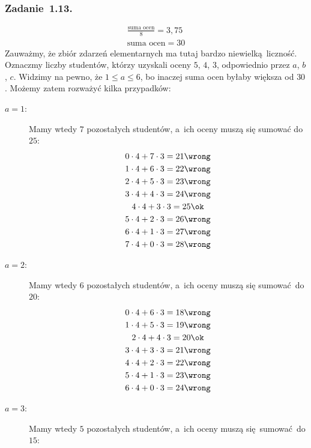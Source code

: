 \subsubsection*{Zadanie~1.13.}
\begin{gather*}
    \frac{\text{suma ocen}}{8} = 3{,}75\\
    \text{suma ocen} = 30
\end{gather*}
Zauważmy, że zbiór zdarzeń elementarnych ma tutaj bardzo niewielką liczność. Oznaczmy liczby studentów, którzy uzyskali oceny \(5\), \(4\), \(3\), odpowiednio przez \(a\), \(b\), \(c\). Widzimy na pewno, że \(1 \leq a \leq 6\), bo inaczej suma ocen byłaby większa od \(30\). Możemy zatem rozważyć kilka przypadków:
\begin{description}
    \item[\(a = 1\):] Mamy wtedy \(7\) pozostałych studentów, a~ich oceny muszą się sumować do \(25\):
        \begin{gather*}
            0 \cdot 4 + 7 \cdot 3 = 21 \wrong\\
            1 \cdot 4 + 6 \cdot 3 = 22 \wrong\\
            2 \cdot 4 + 5 \cdot 3 = 23 \wrong\\
            3 \cdot 4 + 4 \cdot 3 = 24 \wrong\\
            4 \cdot 4 + 3 \cdot 3 = 25 \ok\\
            5 \cdot 4 + 2 \cdot 3 = 26 \wrong\\
            6 \cdot 4 + 1 \cdot 3 = 27 \wrong\\
            7 \cdot 4 + 0 \cdot 3 = 28 \wrong
        \end{gather*}
    \item[\(a = 2\):] Mamy wtedy \(6\) pozostałych studentów, a~ich oceny muszą się sumować do \(20\):
        \begin{gather*}
            0 \cdot 4 + 6 \cdot 3 = 18 \wrong\\
            1 \cdot 4 + 5 \cdot 3 = 19 \wrong\\
            2 \cdot 4 + 4 \cdot 3 = 20 \ok\\
            3 \cdot 4 + 3 \cdot 3 = 21 \wrong\\
            4 \cdot 4 + 2 \cdot 3 = 22 \wrong\\
            5 \cdot 4 + 1 \cdot 3 = 23 \wrong\\
            6 \cdot 4 + 0 \cdot 3 = 24 \wrong
        \end{gather*}
    \item[\(a = 3\):] Mamy wtedy \(5\) pozostałych studentów, a~ich oceny muszą się sumować do \(15\):

\end{description}
